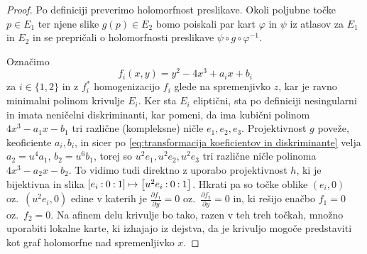 \documentclass[mat1]{fmfdelo}
\numberwithin{equation}{section}
\newcommand{\inv}{^{-1}}
\newcommand{\pcoor}[1]{%
\begingroup\lccode`~=`: \lowercase{\endgroup
\edef~}{\mathbin{\mathchar\the\mathcode`:}\nobreak}%
\left[%
\begingroup
\mathcode`:=\string"8000
#1%
\endgroup
\right]%
}
\newcommand{\pdv}[2][]{\frac{\partial#1}{\partial#2}}
\newcommand{\oz}{oz.\ }
\theoremstyle{definition}
\begin{document}
\begin{proof}
    Po definiciji preverimo holomorfnost preslikave. Okoli poljubne točke $p \in E_1$ ter njene slike $g(p) \in E_2$ bomo poiskali par kart $\varphi$ in $\psi$ iz atlasov za $E_1$ in $E_2$ in se prepričali o holomorfnosti preslikave $\psi \circ g \circ \varphi\inv$. 
    
    Označimo 
    \[
        f_i(x, y) = y^2 - 4x^3 + a_ix + b_i
    \]
    za $i \in \{1,2\}$ in z $f_i^*$ homogenizacijo $f_i$ glede na spremenjivko $z$, kar je ravno minimalni polinom krivulje $E_i$. Ker sta $E_i$ eliptični, sta po definiciji nesingularni in imata neničelni diskriminanti, kar pomeni, da ima kubični polinom $4x^3 - a_1x - b_1$ tri različne (kompleksne) ničle $e_1, e_2, e_3$. Projektivnost $g$ poveže, keoficiente $a_i, b_i$, in sicer po \ref{eq:transformacija koeficientov in diskriminante} velja $a_2 = u^4 a_1$, $b_2 = u^6 b_1$, torej so $u^2e_1, u^2e_2, u^2e_3$ tri različne ničle polinoma $4x^3 - a_2x - b_2$. To vidimo tudi direktno z uporabo projektivnost $h$, ki je bijektivna in slika $\pcoor{e_i : 0 : 1} \mapsto \pcoor{u^2 e_i : 0 : 1}$. Hkrati pa so točke oblike $(e_i, 0)$ \oz $(u^2 e_i, 0)$ edine v katerih je $\pdv[f_1]{y} = 0$ \oz $\pdv[f_2]{y} = 0$ in, ki rešijo enačbo $f_1 = 0$ \oz $f_2 = 0$. Na afinem delu krivulje bo tako, razen v teh treh točkah, množno uporabiti lokalne karte, ki izhajajo iz dejstva, da je krivuljo mogoče predstaviti kot graf holomorfne nad spremenljivko $x$. 
    

\end{proof}
\end{document}
